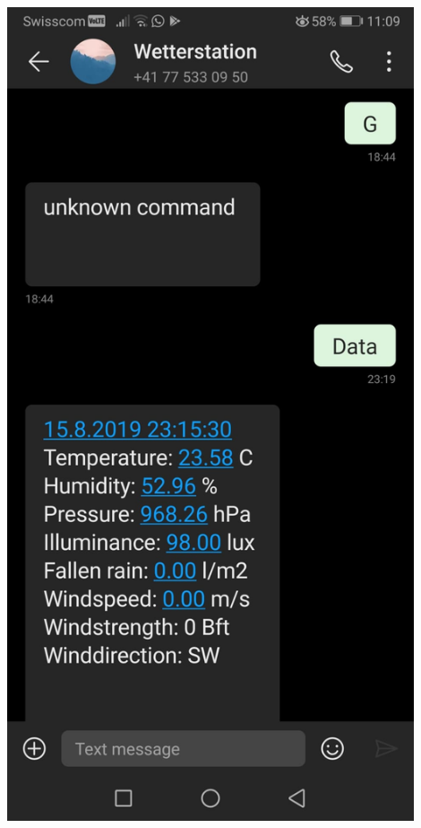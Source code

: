\begin{minipage}[b][6.5cm][t]{0.4\textwidth}
\centering
\includegraphics[width=0.9\textwidth]{../../graphics/FW_val/smsantwort.jpeg} 
\label{fig:validsim808sms}
\end{minipage}


